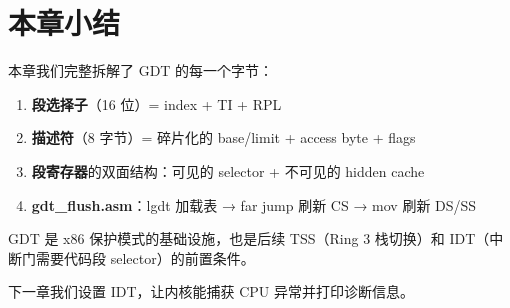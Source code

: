 \section{本章小结}

本章我们完整拆解了 GDT 的每一个字节：

\begin{enumerate}
  \item \textbf{段选择子}（16 位）= index + TI + RPL
  \item \textbf{描述符}（8 字节）= 碎片化的 base/limit + access byte + flags
  \item \textbf{段寄存器}的双面结构：可见的 selector + 不可见的 hidden cache
  \item \textbf{gdt\_flush.asm}：lgdt 加载表 → far jump 刷新 CS → mov 刷新 DS/SS
\end{enumerate}

GDT 是 x86 保护模式的基础设施，也是后续 TSS（Ring 3 栈切换）和
IDT（中断门需要代码段 selector）的前置条件。

下一章我们设置 IDT，让内核能捕获 CPU 异常并打印诊断信息。

